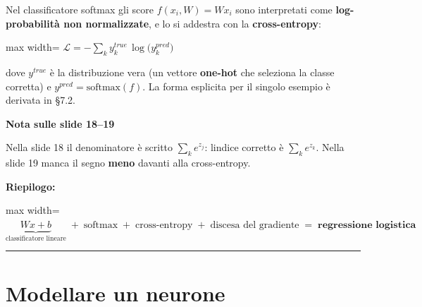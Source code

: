 \documentclass[11pt,a4paper,oneside,openany]{book}
\renewenvironment{quote}{\list{}{\leftmargin=1em\rightmargin=0pt}\item\relax}{\endlist}
\begin{document}
Nel classificatore softmax gli score \(f(x_i,W) = Wx_i\) sono interpretati come \textbf{log-probabilità non normalizzate}, e lo si addestra con la \textbf{cross-entropy}:

\begin{center}
\begin{adjustbox}{max width=\linewidth}
$\displaystyle 
\mathcal{L} = -\sum_{k} y^{true}_{k}\,\log\big(y^{pred}_{k}\big)
$
\end{adjustbox}
\end{center}

dove \(y^{true}\) è la distribuzione vera (un vettore \textbf{one-hot} che seleziona la classe corretta) e \(y^{pred} = \text{softmax}(f)\). La forma esplicita per il singolo esempio è derivata in §7.2.

\begin{quote}
\textbf{Nota sulle slide 18--19}
\end{quote}

\begin{quote}
Nella slide 18 il denominatore è scritto \(\sum_k e^{z_j}\): l\textquotesingle indice corretto è \(\sum_k e^{z_k}\). Nella slide 19 manca il segno \textbf{meno} davanti alla cross-entropy.
\end{quote}

\textbf{Riepilogo:}

\begin{center}
\begin{adjustbox}{max width=\linewidth}
$\displaystyle 
\underbrace{Wx+b}_{\text{classificatore lineare}} \;+\; \text{softmax} \;+\; \text{cross-entropy} \;+\; \text{discesa del gradiente} \;=\; \textbf{regressione logistica}
$
\end{adjustbox}
\end{center}

\begin{center}\rule{0.5\linewidth}{0.5pt}\end{center}

\section{Modellare un neurone}\label{f01-r267}
\end{document}
